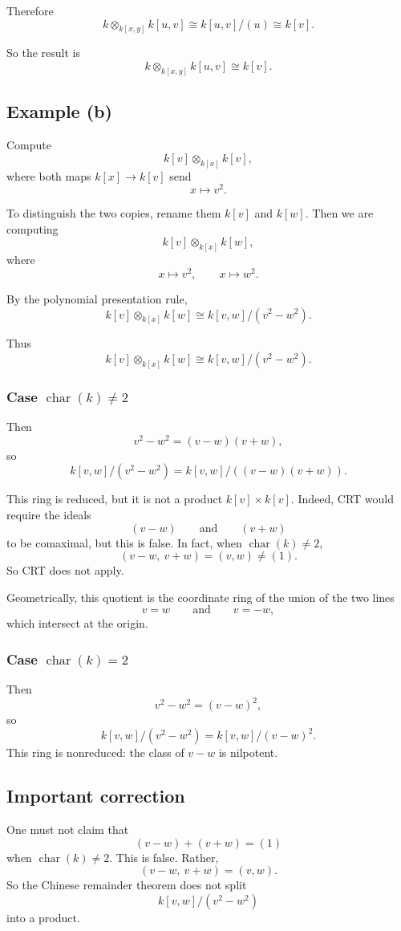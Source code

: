 \documentclass[12pt,a4paper]{article}
\theoremstyle{notespace}
\begin{document}
Therefore
\[
k\otimes_{k[x,y]} k[u,v]\cong k[u,v]/(u)\cong k[v].
\]

So the result is
\[
\boxed{
	k\otimes_{k[x,y]} k[u,v]\cong k[v].
}
\]

\subsection{Example (b)}

Compute
\[
k[v]\otimes_{k[x]} k[v],
\]
where both maps \(k[x]\to k[v]\) send
\[
x\mapsto v^2.
\]

To distinguish the two copies, rename them \(k[v]\) and \(k[w]\). Then we are computing
\[
k[v]\otimes_{k[x]} k[w],
\]
where
\[
x\mapsto v^2,\qquad x\mapsto w^2.
\]

By the polynomial presentation rule,
\[
k[v]\otimes_{k[x]} k[w]\cong k[v,w]/(v^2-w^2).
\]

Thus
\[
\boxed{
	k[v]\otimes_{k[x]} k[w]\cong k[v,w]/(v^2-w^2).
}
\]

\subsubsection*{Case \(\operatorname{char}(k)\neq 2\)}

Then
\[
v^2-w^2=(v-w)(v+w),
\]
so
\[
k[v,w]/(v^2-w^2)=k[v,w]/((v-w)(v+w)).
\]

This ring is reduced, but it is not a product \(k[v]\times k[v]\). Indeed, CRT would require the ideals
\[
(v-w)\qquad\text{and}\qquad (v+w)
\]
to be comaximal, but this is false. In fact, when \(\operatorname{char}(k)\neq 2\),
\[
(v-w,\ v+w)=(v,w)\neq (1).
\]
So CRT does not apply.

Geometrically, this quotient is the coordinate ring of the union of the two lines
\[
v=w
\qquad\text{and}\qquad
v=-w,
\]
which intersect at the origin.

\subsubsection*{Case \(\operatorname{char}(k)=2\)}

Then
\[
v^2-w^2=(v-w)^2,
\]
so
\[
k[v,w]/(v^2-w^2)=k[v,w]/(v-w)^2.
\]
This ring is nonreduced: the class of \(v-w\) is nilpotent.

\subsection{Important correction}

One must not claim that
\[
(v-w)+(v+w)=(1)
\]
when \(\operatorname{char}(k)\neq 2\). This is false. Rather,
\[
(v-w,\ v+w)=(v,w).
\]
So the Chinese remainder theorem does not split
\[
k[v,w]/(v^2-w^2)
\]
into a product.
\end{document}

